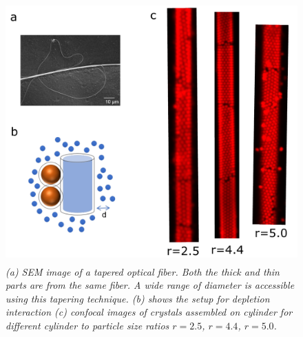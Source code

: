 \documentclass[12pt]{article}
\begin{document}
\begin{figure}[h]
	\setcounter{topnumber}{1}
	\setcounter{bottomnumber}{1}
	\setcounter{totalnumber}{1}
	\renewcommand{\topfraction}{0.95}
	\renewcommand{\bottomfraction}{0.95}
	\renewcommand{\textfraction}{0.15}
	\renewcommand{\floatpagefraction}{0.9}
    \centering
    \includegraphics[width = 11.6cm, height = 10cm]{fig1}
    \caption{\textit{(a) SEM image of a tapered optical fiber. Both the thick and thin parts are from the same fiber. A wide range of diameter is accessible using this tapering technique. (b) shows the setup for depletion interaction (c) confocal images of crystals assembled on cylinder for different cylinder to particle size ratios \( r = 2.5\), \( r = 4.4\), \(r = 5.0\).}}
    \label{fig1:setup}
\end{figure}

\paragraph{}
\end{document}
